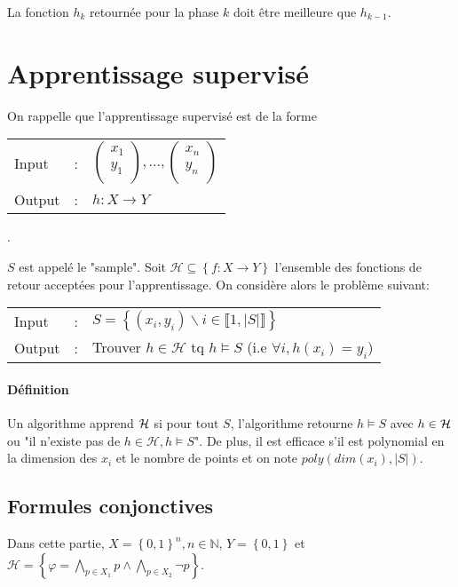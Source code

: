 \documentclass{article}
\begin{document}
    La fonction $h_k$ retournée pour la phase $k$ doit être meilleure que $h_{k-1}$.

    \section{Apprentissage supervisé}
    On rappelle que l'apprentissage supervisé est de la forme \begin{tabular}{l c l}
     Input & : & $\begin{pmatrix}
                     x_1 \\
                     y_1 \\
                 \end{pmatrix}, \dots,
                     \begin{pmatrix}
                     x_n \\
                     y_n \\
                     \end{pmatrix}$ \\
    Output & : & $h : X \rightarrow Y$\\
    \end{tabular}.

    $S$ est appelé le "sample". Soit $\mathcal{H}\subseteq \left\{f : X \rightarrow Y\right\}$ l'ensemble des fonctions de retour acceptées pour l'apprentissage. On considère alors le
    problème suivant:

    \begin{tabular}{l c l}
     Input & : & $S = \left\{ (x_i,y_i) \backslash i\in \llbracket 1, \lvert S \rvert  \rrbracket \right\}$ \\
    Output & : & Trouver $h\in \mathcal{H}$ tq $h\models S$ (i.e $\forall i, h(x_i)=y_i$)\\
    \end{tabular}

    \paragraph{Définition} Un algorithme apprend $\cal{H}$ si pour tout $S$,
    l'algorithme retourne $h\models S$ avec $h\in \cal{H}$ ou "il n'existe pas
    de $h\in \mathcal{H},  h\models S$". De plus, il est efficace s'il est polynomial en la dimension des $x_i$ et le nombre de points et on note
    $poly(dim(x_i),\lvert S \rvert)$.

    \subsection{Formules conjonctives}
    Dans cette partie, $X = \left\{0,1 \right\}^n, n\in \mathbb{N}$, $Y = \left\{0,1 \right\}$ et $\mathcal{H} = \left\{\varphi = \bigwedge_{p\in X_1} p \wedge \bigwedge_{p\in X_2} \neg p \right\}$.
\end{document}
